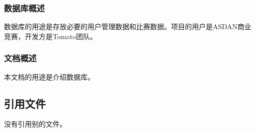 \documentclass{article}
\begin{document}
\subsubsection{数据库概述}

数据库的用途是存放必要的用户管理数据和比赛数据。项目的用户是ASDAN商业竞赛，开发方是Tomato团队。

\subsubsection{文档概述}

本文档的用途是介绍数据库。

\subsection{引用文件}

没有引用别的文件。
\end{document}
